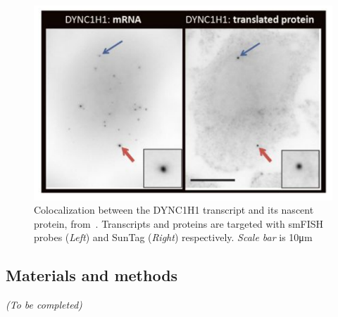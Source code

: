 \begin{figure}[]
    \centering
    \includegraphics[width=\textwidth]{figures/chapter5/translation_factory}
    \caption{Colocalization between the DYNC1H1 transcript and its nascent protein, from~\cite{pichon_visualization_2016}.
	Transcripts and proteins are targeted with smFISH probes (\textit{Left}) and SunTag (\textit{Right}) respectively.
	\textit{Scale bar} is 10μm}
    \label{fig:translation_factory}
\end{figure}

\subsection{Materials and methods}
\label{subsec:materials_translation_factories}

\begin{center}
	\textit{(To be completed)}
\end{center}



